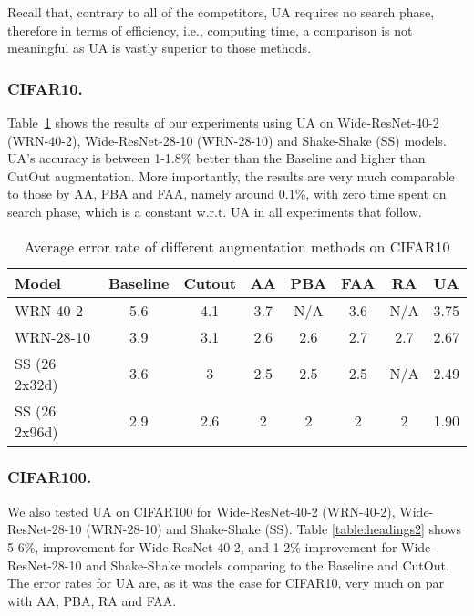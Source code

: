 \documentclass[runningheads]{llncs}
\begin{document}
	Recall that, contrary to all of the competitors, UA requires no search phase, therefore in terms of efficiency, i.e., computing time, a comparison is not meaningful as UA is vastly superior to those methods.
	
	\subsubsection{CIFAR10.}
Table~\ref{table:cifar10} shows the results of our experiments using UA on Wide-ResNet-40-2 (WRN-40-2), Wide-ResNet-28-10 (WRN-28-10) \cite{wideresnet} and Shake-Shake (SS) \cite{shake-shake} models. UA's accuracy is between 1-1.8\% better than the Baseline and  higher than CutOut augmentation. More importantly, the results are very much comparable to those by AA, PBA and FAA, namely around 0.1\%, with zero time spent on search phase, which is a constant w.r.t. UA in all experiments that follow.
	
	\begin{table} [htb]
		\begin{center}
			\caption{Average error rate of different augmentation methods on CIFAR10}
			\label{table:cifar10}
			\begin{tabular}{l | cccccc|l}
				\hline Model & Baseline & Cutout & AA & PBA  & FAA  & RA  & {UA}\\
\hline \hline WRN-40-2  & 5.6  & 4.1 & 3.7 & N/A & 3.6 & N/A &{3.75}\\
				WRN-28-10 & 3.9 & 3.1 & 2.6 & 2.6 & 2.7 & 2.7 & {2.67}\\
				SS (26 2x32d) & 3.6 & 3 & 2.5 & 2.5 & 2.5 & N/A &{2.49} \\
				SS (26 2x96d) & 2.9 & 2.6 & 2 & 2 & 2 & 2 & {1.90}\\
				\hline
			\end{tabular}
		\end{center}
	\end{table}
	
	\subsubsection{CIFAR100.}
	We also tested UA on CIFAR100 for Wide-ResNet-40-2 (WRN-40-2), Wide-ResNet-28-10 (WRN-28-10) and Shake-Shake (SS). Table \ref{table:headings2} shows 5-6\%, improvement for Wide-ResNet-40-2, and 1-2\% improvement for Wide-ResNet-28-10  and Shake-Shake models comparing to the Baseline and CutOut. The error rates for UA are, as it was the case for CIFAR10, very much on par with AA, PBA, RA and FAA. 
	
\end{document}
